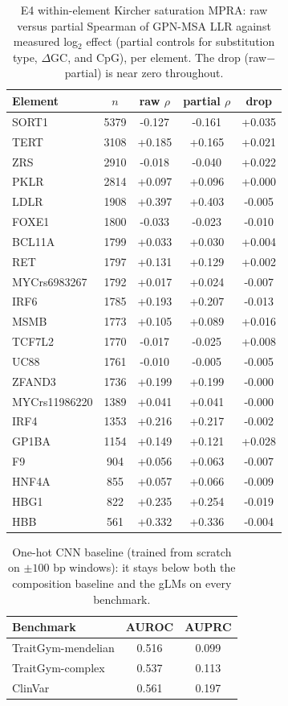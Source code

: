 \documentclass[11pt]{article}
\begin{document}
\begin{table}[h]
\centering
\caption{E4 within-element Kircher saturation MPRA: raw versus partial Spearman of GPN-MSA
LLR against measured log$_2$ effect (partial controls for substitution type, $\Delta$GC, and
CpG), per element. The drop (raw$-$partial) is near zero throughout.}
\small
\begin{tabular}{lcccc}
\toprule
Element & $n$ & raw $\rho$ & partial $\rho$ & drop \\
\midrule
SORT1 & 5379 & -0.127 & -0.161 & +0.035 \\
TERT & 3108 & +0.185 & +0.165 & +0.021 \\
ZRS & 2910 & -0.018 & -0.040 & +0.022 \\
PKLR & 2814 & +0.097 & +0.096 & +0.000 \\
LDLR & 1908 & +0.397 & +0.403 & -0.005 \\
FOXE1 & 1800 & -0.033 & -0.023 & -0.010 \\
BCL11A & 1799 & +0.033 & +0.030 & +0.004 \\
RET & 1797 & +0.131 & +0.129 & +0.002 \\
MYCrs6983267 & 1792 & +0.017 & +0.024 & -0.007 \\
IRF6 & 1785 & +0.193 & +0.207 & -0.013 \\
MSMB & 1773 & +0.105 & +0.089 & +0.016 \\
TCF7L2 & 1770 & -0.017 & -0.025 & +0.008 \\
UC88 & 1761 & -0.010 & -0.005 & -0.005 \\
ZFAND3 & 1736 & +0.199 & +0.199 & -0.000 \\
MYCrs11986220 & 1389 & +0.041 & +0.041 & -0.000 \\
IRF4 & 1353 & +0.216 & +0.217 & -0.002 \\
GP1BA & 1154 & +0.149 & +0.121 & +0.028 \\
F9 & 904 & +0.056 & +0.063 & -0.007 \\
HNF4A & 855 & +0.057 & +0.066 & -0.009 \\
HBG1 & 822 & +0.235 & +0.254 & -0.019 \\
HBB & 561 & +0.332 & +0.336 & -0.004 \\
\bottomrule
\end{tabular}
\end{table}

\begin{table}[h]
\centering
\caption{One-hot CNN baseline (trained from scratch on $\pm100$ bp windows): it stays below
both the composition baseline and the gLMs on every benchmark.}
\small
\begin{tabular}{lcc}
\toprule
Benchmark & AUROC & AUPRC \\
\midrule
TraitGym-mendelian & 0.516 & 0.099 \\
TraitGym-complex & 0.537 & 0.113 \\
ClinVar & 0.561 & 0.197 \\
\bottomrule
\end{tabular}
\end{table}
\end{document}
